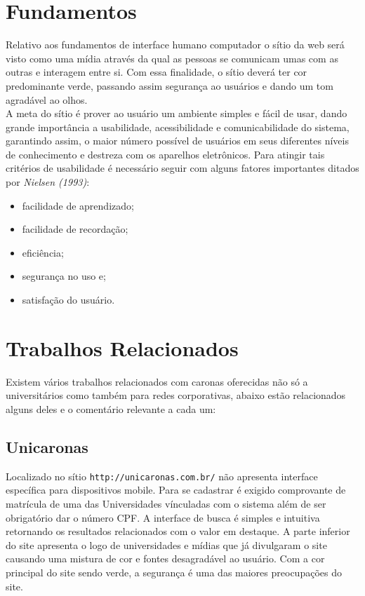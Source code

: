 \documentclass{sig-alternate}
\begin{document}
\section{Fundamentos}
Relativo aos fundamentos de interface humano computador o sítio da web 
será visto como uma mídia através da qual as pessoas se comunicam umas 
com as outras e interagem entre si. Com essa finalidade, o sítio deverá 
ter cor predominante verde, passando assim segurança ao usuários e 
dando um tom agradável ao olhos.\\
A meta do sítio é prover ao usuário um ambiente simples e fácil de usar, 
dando grande importância a usabilidade, acessibilidade e comunicabilidade 
do sistema, garantindo assim, o maior número possível de usuários em 
seus diferentes níveis de conhecimento e destreza com os aparelhos 
eletrônicos. Para atingir tais critérios de usabilidade é necessário 
seguir com alguns fatores importantes ditados por {\it Nielsen (1993)}:
\begin{itemize}
	\item facilidade de aprendizado;
	\item facilidade de recordação;
	\item eficiência;
	\item segurança no uso e;
	\item satisfação do usuário.
\end{itemize}
\pagebreak


\section{Trabalhos Relacionados}
Existem vários trabalhos relacionados com caronas oferecidas não só a 
universitários como também para redes corporativas, abaixo estão 
relacionados alguns deles e o comentário relevante a cada um:

\subsection{Unicaronas}
Localizado no sítio {\tt  http://unicaronas.com.br/} não apresenta 
interface específica para dispositivos mobile. Para se cadastrar é exigido 
comprovante de matrícula de uma das Universidades vínculadas com o 
sistema além de ser obrigatório dar o número CPF. A interface de busca é 
simples e intuitiva retornando os resultados relacionados com o valor em destaque.
A parte inferior do site apresenta o logo de universidades e mídias que 
já divulgaram o site causando uma mistura de cor e fontes desagradável ao usuário. 
Com a cor principal do site sendo verde, a segurança é uma das maiores preocupações do site. 
\end{document}
